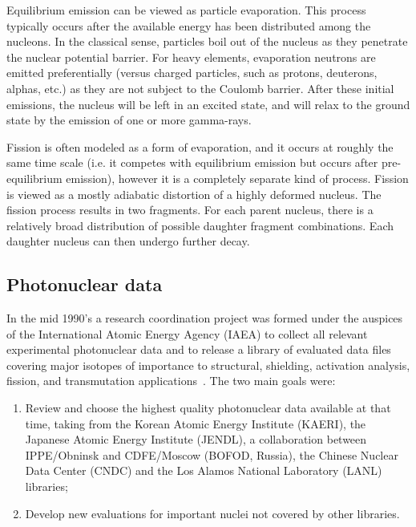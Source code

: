 Equilibrium emission can be viewed as particle evaporation. This process typically occurs after the available energy has been distributed among the nucleons. In the classical sense, particles boil out of the nucleus as they penetrate the nuclear potential barrier. For heavy elements, evaporation neutrons are emitted preferentially (versus charged particles, such as protons, deuterons, alphas, etc.) as they are not subject to the Coulomb barrier. After these initial emissions, the nucleus will be left in an excited state, and will relax to the ground state by the emission of one or more gamma-rays. 

Fission is often modeled as a form of evaporation, and it occurs at roughly the same time scale (i.e. it competes with equilibrium emission but occurs after pre-equilibrium emission), however it is a completely separate kind of process.  Fission is viewed as a mostly adiabatic distortion of a highly deformed nucleus. The fission process results in two fragments.  For each parent nucleus, there is a relatively broad distribution of possible daughter fragment combinations. Each daughter nucleus can then undergo further decay.

\subsection{Photonuclear data}\label{Photonuclear data}


In the mid 1990's a research coordination project was formed under the auspices of the International Atomic Energy Agency (IAEA) to collect all relevant experimental photonuclear data and to release a library of evaluated data files covering major isotopes of importance to structural, shielding, activation analysis, fission, and transmutation applications~\cite{Oblozinsky 1998}.  
The two main goals were:
\begin{enumerate}
	\item Review and choose the highest quality photonuclear data available at that time, taking from the Korean Atomic Energy Institute (KAERI), the Japanese Atomic Energy Institute 
(JENDL), a collaboration between IPPE/Obninsk and CDFE/Moscow (BOFOD, Russia), 
the Chinese Nuclear Data Center (CNDC) and the Los Alamos National Laboratory (LANL) libraries;
	\item Develop new evaluations for important nuclei not covered by other libraries.
\end{enumerate}

